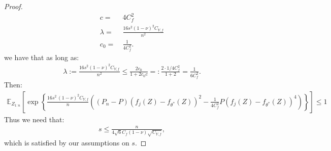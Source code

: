 \documentclass[12pt]{extarticle} %
\newcommand{\E}{\mathbb{E}}
\begin{document}
\begin{proof}
\begin{align*}
    c =~& 4C_f^2\nonumber\\
    \lambda =~& \frac{16s^2(1-\nu)^2C_{Y,f}}{n^2}\nonumber\\
    c_0 =~& \frac{1}{4C_f^2}.
\end{align*}
we have that as long as:
\begin{align*}
    \lambda := \frac{16s^2(1-\nu)^2C_{Y,f}}{n^2} \leq \frac{2c_0}{1+2c_0 c} =: \frac{2\cdot 1/4C_f^2}{1 + 2} = \frac{1}{6C_f^2}.
\end{align*}
Then:
\begin{align*}
    \E_{Z_{1:n}}\left[ \exp\left\{\frac{16s^2\,(1-\nu)^2 C_{Y,f}}{n} \left(\left(P_n - P\right)(f_{j}(Z) - f_{\theta^*}(Z))^2 - \frac{1}{4C_f^2} P (f_{j}(Z) - f_{\theta^*}(Z))^4 \right)\right\}\right]\leq 1
\end{align*}
Thus we need that:
\begin{align*}
    s \leq \frac{n}{4\sqrt{6} C_f (1-\nu) \sqrt{C_{Y,f}}},
\end{align*}
which is satisfied by our assumptions on $s$.
\end{proof}
\end{document}
